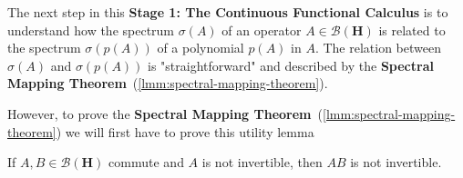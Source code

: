 The next step in this \textbf{Stage 1: The Continuous Functional Calculus} is to understand how the spectrum $\sigma(A)$ of an operator $A \in \mathcal{B}(\mathbf{H})$ is related to the spectrum $\sigma(p(A))$ of a polynomial $p(A)$ in $A$. The relation between $\sigma(A)$ and $\sigma(p(A))$ is "straightforward" and described by the \textbf{Spectral Mapping Theorem}~(\ref{lmm:spectral-mapping-theorem}).

However, to prove the \textbf{Spectral Mapping Theorem}~(\ref{lmm:spectral-mapping-theorem}) we will first have to prove this utility lemma

\begin{lemma}
    \label{lmm:hall-ex-8.3.1}
    \leanok
    If $A,B \in \mathcal{B}(\mathbf{H})$ commute and $A$ is not invertible, then $AB$ is not invertible.
\end{lemma}
